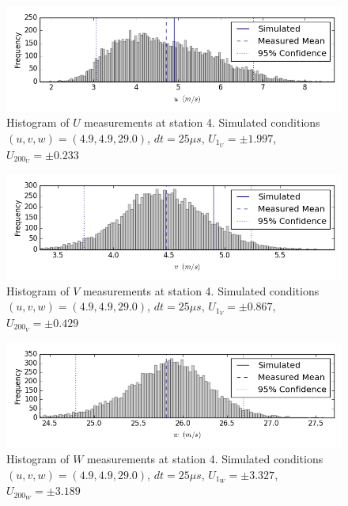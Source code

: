 \begin{figure}[H]
\centering
\includegraphics[width=6in]{figs/Ely_May28th04001/uncertainty_Ely_May28th04001_U}
\caption{Histogram of $U$ measurements at station 4. Simulated conditions $(u,v,w)=(4.9, 4.9, 29.0)$, $dt=25 \mu s$, $U_{1_{U}}=\pm 1.997$, $U_{200_{U}}=\pm 0.233$}
\label{fig:uncertainty_Ely_May28th04001_U}
\end{figure}


\begin{figure}[H]
\centering
\includegraphics[width=6in]{figs/Ely_May28th04001/uncertainty_Ely_May28th04001_V}
\caption{Histogram of $V$ measurements at station 4. Simulated conditions $(u,v,w)=(4.9, 4.9, 29.0)$, $dt=25 \mu s$, $U_{1_{V}}=\pm 0.867$, $U_{200_{V}}=\pm 0.429$}
\label{fig:uncertainty_Ely_May28th04001_V}
\end{figure}


\begin{figure}[H]
\centering
\includegraphics[width=6in]{figs/Ely_May28th04001/uncertainty_Ely_May28th04001_W}
\caption{Histogram of $W$ measurements at station 4. Simulated conditions $(u,v,w)=(4.9, 4.9, 29.0)$, $dt=25 \mu s$, $U_{1_{W}}=\pm 3.327$, $U_{200_{W}}=\pm 3.189$}
\label{fig:uncertainty_Ely_May28th04001_W}
\end{figure}


